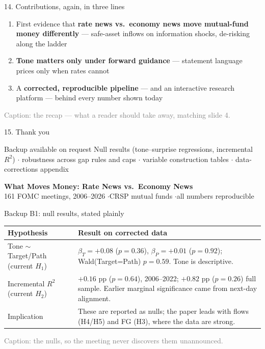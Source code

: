 \documentclass[aspectratio=169, 11pt]{beamer}
\newenvironment{ablock}[1]{\begin{block}{#1}}{\end{block}}
\begin{document}
\begin{frame}{14. Contributions, again, in three lines}
  \begin{enumerate}
    \item First evidence that \textbf{rate news vs.\ economy news move mutual-fund money differently} ---
          safe-asset inflows on information shocks, de-risking along the ladder
    \item \textbf{Tone matters only under forward guidance} --- statement language prices only when rates cannot
    \item A \textbf{corrected, reproducible pipeline} --- and an interactive research platform --- behind every number shown today
  \end{enumerate}
  {\scriptsize\textcolor{gray}{Caption: the recap --- what a reader should take away, matching slide 4.}}
\end{frame}

\begin{frame}{15. Thank you}
  \begin{ablock}{Backup available on request}
    Null results (tone--surprise regressions, incremental $R^2$) $\cdot$ robustness across gap rules and caps
    $\cdot$ variable construction tables $\cdot$ data-corrections appendix
  \end{ablock}
  \centering
  \vspace{0.6em}
  \textbf{What Moves Money: Rate News vs.\ Economy News}\\
  \small 161 FOMC meetings, 2006--2026 \quad$\cdot$\quad CRSP mutual funds \quad$\cdot$\quad all numbers reproducible
\end{frame}

\appendix

\begin{frame}{Backup B1: null results, stated plainly}
  \footnotesize
  \begin{tabularx}{\textwidth}{l X}
    \toprule
    \textbf{Hypothesis} & \textbf{Result on corrected data} \\
    \midrule
    Tone $\sim$ Target/Path (current $H_1$) & $\beta_T = +0.08$ ($p=0.36$), $\beta_P = +0.01$ ($p=0.92$); Wald(Target=Path) $p=0.59$. Tone is descriptive. \\
    Incremental $R^2$ (current $H_2$) & $+0.16$ pp ($p=0.64$), 2006--2022; $+0.82$ pp ($p=0.26$) full sample. Earlier marginal significance came from next-day alignment. \\
    Implication & These are reported as nulls; the paper leads with flows (H4/H5) and FG (H3), where the data are strong. \\
    \bottomrule
  \end{tabularx}
  {\scriptsize\textcolor{gray}{Caption: the nulls, so the meeting never discovers them unannounced.}}
\end{frame}
\end{document}
